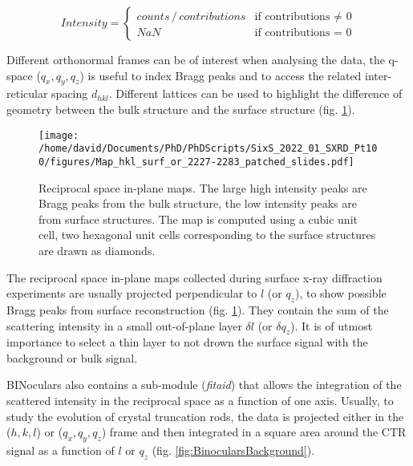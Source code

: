 \begin{equation}
    \label{eq:BinocularsIntensity}
    Intensity =
        \begin{cases}
            counts \, /  \,contributions  & \text{if contributions $\neq$ 0} \\
            NaN & \text{if contributions = 0}
        \end{cases}
\end{equation}

Different orthonormal frames can be of interest when analysing the data, the q-space ($q_x, q_y, q_z$) is useful to index Bragg peaks and to access the related inter-reticular spacing $d_{hkl}$.
Different lattices can be used to highlight the difference of geometry between the bulk structure and the surface structure (fig. \ref{fig:MapExampleBinoculars}).

\begin{figure}[!htb]
    \centering
    \texttt{[image: /home/david/Documents/PhD/PhDScripts/SixS\_2022\_01\_SXRD\_Pt100/figures/Map\_hkl\_surf\_or\_2227-2283\_patched\_slides.pdf]}
    \caption{
    Reciprocal space in-plane maps.
    The large high intensity peaks are Bragg peaks from the bulk structure, the low intensity peaks are from surface structures.
    The map is computed using a cubic unit cell, two hexagonal unit cells corresponding to the surface structures are drawn as diamonds.
    }
    \label{fig:MapExampleBinoculars}
\end{figure}

The reciprocal space in-plane maps collected during surface x-ray diffraction experiments are usually projected perpendicular to $l$ (or $q_z$), to show possible Bragg peaks from surface reconstruction (fig. \ref{fig:MapExampleBinoculars}).
They contain the sum of the scattering intensity in a small out-of-plane layer $\delta l$ (or $\delta q_z$).
It is of utmost importance to select a thin layer to not drown the surface signal with the background or bulk signal.

BINoculars also contains a sub-module (\textit{fitaid}) that allows the integration of the scattered intensity in the reciprocal space as a function of one axis.
Usually, to study the evolution of crystal truncation rods, the data is projected either in the ($h, k, l$) or ($q_x, q_y, q_z$) frame and then integrated in a square area around the CTR signal as a function of $l$ or $q_z$ (fig. \ref{fig:BinocularsBackground}).

